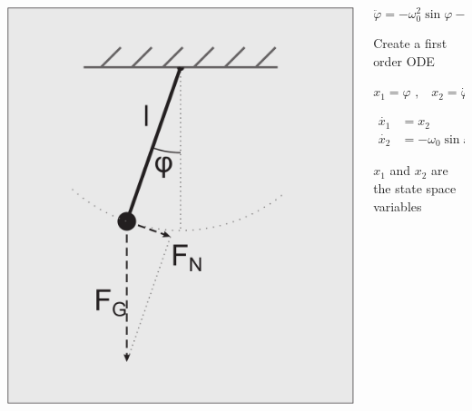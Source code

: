 \begin{frame}[fragile]


\vspace{2ex}

\begin{columns}[T]
  \begin{column}{0.35\textwidth}
    \includegraphics[draft=false,width=1.0\textwidth]{pendulum.pdf}

   \vspace{4ex}
  \end{column}

  \begin{column}{0.65\textwidth}

 $$\ddot{\varphi} = -\omega_0^2 \sin \varphi - \mu \dot{\varphi} + \varepsilon \sin \omega_E t $$

 \vspace{2ex}

 Create a first order ODE

 \vspace{1ex}

 \centerline{$x_1 = \varphi \,\, \text{,} \quad x_2 = \dot{\varphi}$}

 \vspace{-3ex}
 \begin{align*}
   \dot{x_1} &= x_2 \\
   \dot{x_2} &= - \omega_0  \sin x_1 - \mu x_2 + \varepsilon \sin \omega_E t  
 \end{align*}


 $x_1$ and $x_2$ are the state space variables

 
  \end{column}
\end{columns}

 

\end{frame}
